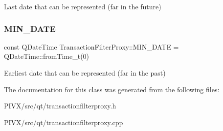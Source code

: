 Last date that can be represented (far in the future) \mbox{\label{class_transaction_filter_proxy_aac7bf4c1105641b19eb6f7c8741b502e}} 
\subsubsection{\texorpdfstring{M\+I\+N\+\_\+\+D\+A\+TE}{MIN\_DATE}}
{\footnotesize\ttfamily const Q\+Date\+Time Transaction\+Filter\+Proxy\+::\+M\+I\+N\+\_\+\+D\+A\+TE = Q\+Date\+Time\+::from\+Time\+\_\+t(0)\hspace{0.3cm}{\ttfamily [static]}}

Earliest date that can be represented (far in the past) 

The documentation for this class was generated from the following files\+:\begin{DoxyCompactItemize}
\item 
P\+I\+V\+X/src/qt/transactionfilterproxy.\+h\item 
P\+I\+V\+X/src/qt/transactionfilterproxy.\+cpp\end{DoxyCompactItemize}
